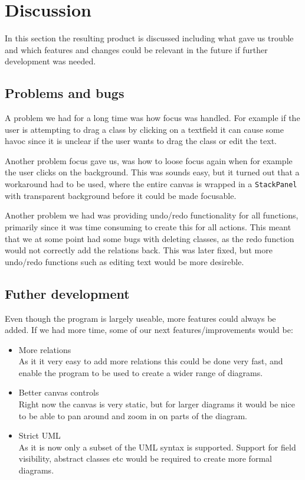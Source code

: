 \section{Discussion}
In this section the resulting product is discussed including what gave us trouble and
which features and changes could be relevant in the future if further
development was needed.

\subsection{Problems and bugs}
A problem we had for a long time was how focus was handled. For example if the
user is attempting to drag a class by clicking on a textfield it can cause some
havoc since it is unclear if the user wants to drag the class or edit the text. 

Another problem focus gave us, was how to loose focus again when for example the
user clicks on the background. This was sounds easy, but it turned out that a
workaround had to be used, where the entire canvas is wrapped in a
\texttt{StackPanel} with transparent background before it could be made
focusable.

Another problem we had was providing undo/redo functionality for all functions,
primarily since it was time consuming to create this for all actions. This meant
that we at some point had some bugs with deleting classes, as the redo function
would not correctly add the relations back. This was later fixed, but more
undo/redo functions such as editing text would be more desireble. 

\subsection{Futher development}
Even though the program is largely useable, more features could always be added.
If we had more time, some of our next features/improvements would be:

\begin{itemize}
		\item More relations\\As it it very easy to add more relations this
				could be done very fast, and enable the program to be used to
				create a wider range of diagrams.

		\item Better canvas controls\\Right now the canvas is very static, but
				for larger diagrams it would be nice to be able to pan around
				and zoom in on parts of the diagram.

		\item Strict UML\\As it is now only a subset of the UML syntax is
				supported. Support for field visibility, abstract classes etc
				would be required to create more formal diagrams.
\end{itemize}
